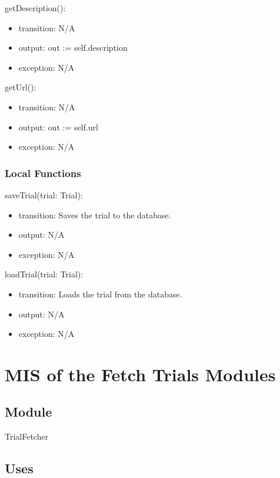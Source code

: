 \documentclass[12pt, titlepage]{article}
\begin{document}
\noindent getDescription():
\begin{itemize}
\item transition: N/A
\item output: out := self.description
\item exception: N/A
\end{itemize}

\noindent getUrl():
\begin{itemize}
\item transition: N/A
\item output: out := self.url
\item exception: N/A
\end{itemize}

\subsubsection{Local Functions}
\noindent saveTrial(trial: Trial):
\begin{itemize}
\item transition: Saves the trial to the database.
\item output: N/A
\item exception: N/A
\end{itemize}

\noindent loadTrial(trial: Trial):
\begin{itemize}
\item transition: Loads the trial from the database.
\item output: N/A
\item exception: N/A
\end{itemize}

\newpage



\section{MIS of the Fetch Trials Modules} \label{User}

\subsection{Module}

TrialFetcher

\subsection{Uses}
\end{document}
